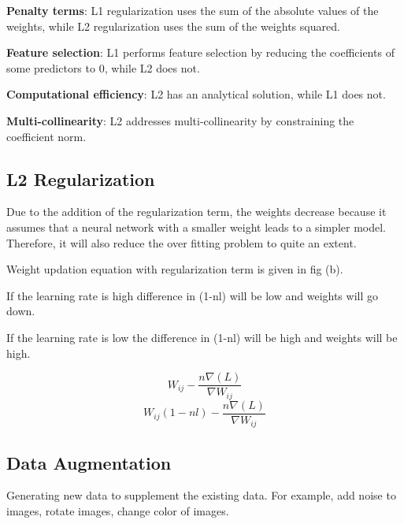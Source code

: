 	\vspace{\baselineskip}
	\begin{bulletedlist}
		\item {\bfseries Penalty terms}: L1 regularization uses the sum of the absolute values of the weights, while L2 regularization uses the sum of the weights squared.
		\item {\bfseries Feature selection}: L1 performs feature selection by reducing the coefficients of some predictors to 0, while L2 does not.
		\item {\bfseries Computational efficiency}: L2 has an analytical solution, while L1 does not.
		\item {\bfseries Multi-collinearity}: L2 addresses multi-collinearity by constraining the coefficient norm.
	\end{bulletedlist}

	\subsection{L2 Regularization}
	\begin{bulletedlist}
		\item Due to the addition of the regularization term, the weights decrease because it assumes that a neural network with a smaller weight leads to
a simpler model. Therefore, it will also reduce the over fitting problem to quite an extent.
		\item Weight updation equation with regularization term is given in fig (b).
		\item If the learning rate is high difference in (1-nl) will be low and weights will go down.
		\item If the learning rate is low the difference in (1-nl) will be high and weights will be high.
	\end{bulletedlist}

	\begin{equation}
		W_{ij} - \frac{n\nabla\left(L\right)}{\nabla W_{ij}}
	\end{equation}
	\begin{equation}
		W_{ij}\left(1-nl\right) - \frac{n\nabla\left(L\right)}{\nabla W_{ij}}
	\end{equation}
	\begin{mathwhere}[0.75in]
	\end{mathwhere}

	\subsection{Data Augmentation}
Generating new data to supplement the existing data.  For example, add noise to images, rotate images, change color of images.

